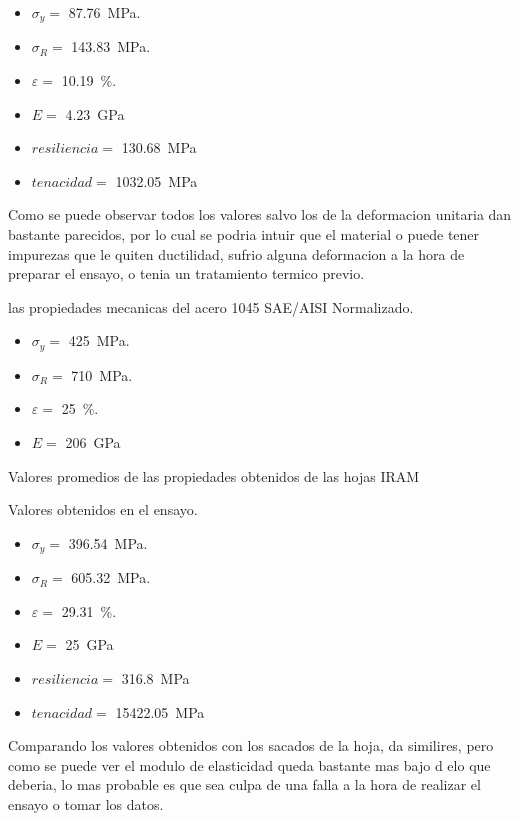 \documentclass[12pt,a4paper]{article}
\begin{document}
\begin{itemize}
    \item $\sigma_y =$ \SI{87,76}{\mega\pascal}.
    \item $\sigma_R =$ \SI{143,83}{\mega\pascal}.
    \item $\varepsilon =$ \SI{10,19}{\percent}.
    \item $E =$ \SI{4.23}{\giga\pascal}
    \item $resiliencia =$ \SI{130.68}{\mega\pascal}
    \item $tenacidad =$ \SI{1032.05}{\mega\pascal}
\end{itemize}

Como se puede observar todos los valores salvo los de la deformacion unitaria dan bastante parecidos, por lo cual se podria intuir que el material o puede tener impurezas que le quiten ductilidad, sufrio alguna deformacion a la hora de preparar el ensayo, o tenia un tratamiento termico previo.

las propiedades mecanicas del acero 1045 SAE/AISI Normalizado.

\begin{itemize}
    \item $\sigma_y =$ \SI{425}{\mega\pascal}.
    \item $\sigma_R =$ \SI{710}{\mega\pascal}.
    \item $\varepsilon =$ \SI{25}{\percent}.
    \item $E =$ \SI{206}{\giga\pascal}
\end{itemize}
Valores promedios de las propiedades obtenidos de las hojas IRAM

Valores obtenidos en el ensayo.

\begin{itemize}
    \item $\sigma_y =$ \SI{396,54}{\mega\pascal}.
    \item $\sigma_R =$ \SI{605,32}{\mega\pascal}.
    \item $\varepsilon =$ \SI{29,31}{\percent}.
    \item $E =$ \SI{25}{\giga\pascal}
    \item $resiliencia =$ \SI{316,8}{\mega\pascal}
    \item $tenacidad =$ \SI{15422,05}{\mega\pascal}
\end{itemize}

Comparando los valores obtenidos con los sacados de la hoja, da similires, pero como se puede ver el modulo de elasticidad queda bastante mas bajo d elo que deberia, lo mas probable es que sea culpa de una falla a la hora de realizar el ensayo o tomar los datos.
\end{document}
